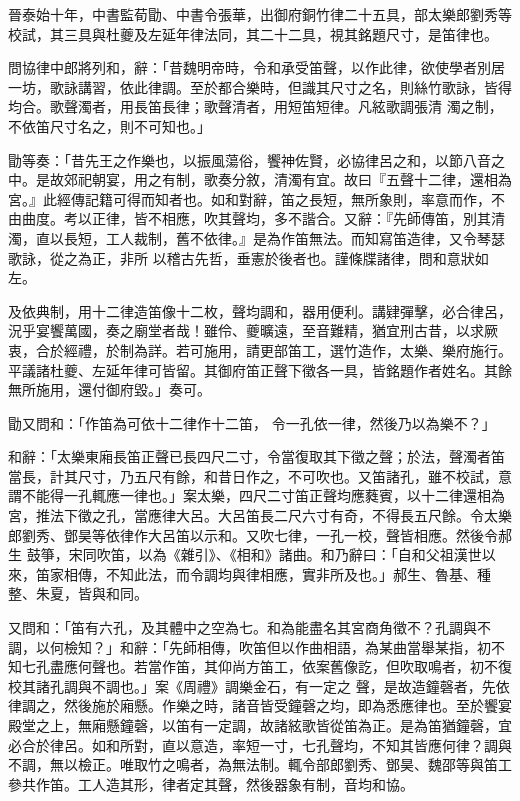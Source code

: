 \begin{pinyinscope}
 晉泰始十年，中書監荀勖、中書令張華，出御府銅竹律二十五具，部太樂郎劉秀等校試，其三具與杜夔及左延年律法同，其二十二具，視其銘題尺寸，是笛律也。



 問協律中郎將列和，辭：「昔魏明帝時，令和承受笛聲，以作此律，欲使學者別居一坊，歌詠講習，依此律調。至於都合樂時，但識其尺寸之名，則絲竹歌詠，皆得均合。歌聲濁者，用長笛長律；歌聲清者，用短笛短律。凡絃歌調張清
 濁之制，不依笛尺寸名之，則不可知也。」



 勖等奏：「昔先王之作樂也，以振風蕩俗，饗神佐賢，必協律呂之和，以節八音之中。是故郊祀朝宴，用之有制，歌奏分敘，清濁有宜。故曰『五聲十二律，還相為宮。』此經傳記籍可得而知者也。如和對辭，笛之長短，無所象則，率意而作，不由曲度。考以正律，皆不相應，吹其聲均，多不諧合。又辭：『先師傳笛，別其清濁，直以長短，工人裁制，舊不依律。』是為作笛無法。而知寫笛造律，又令琴瑟歌詠，從之為正，非所
 以稽古先哲，垂憲於後者也。謹條牒諸律，問和意狀如左。



 及依典制，用十二律造笛像十二枚，聲均調和，器用便利。講肄彈擊，必合律呂，況乎宴饗萬國，奏之廟堂者哉！雖伶、夔曠遠，至音難精，猶宜刑古昔，以求厥衷，合於經禮，於制為詳。若可施用，請更部笛工，選竹造作，太樂、樂府施行。平議諸杜夔、左延年律可皆留。其御府笛正聲下徵各一具，皆銘題作者姓名。其餘無所施用，還付御府毀。」奏可。



 勖又問和：「作笛為可依十二律作十二笛，
 令一孔依一律，然後乃以為樂不？」



 和辭：「太樂東廂長笛正聲已長四尺二寸，令當復取其下徵之聲；於法，聲濁者笛當長，計其尺寸，乃五尺有餘，和昔日作之，不可吹也。又笛諸孔，雖不校試，意謂不能得一孔輒應一律也。」案太樂，四尺二寸笛正聲均應蕤賓，以十二律還相為宮，推法下徵之孔，當應律大呂。大呂笛長二尺六寸有奇，不得長五尺餘。令太樂郎劉秀、鄧昊等依律作大呂笛以示和。又吹七律，一孔一校，聲皆相應。然後令郝生
 鼓箏，宋同吹笛，以為《雜引》、《相和》諸曲。和乃辭曰：「自和父祖漢世以來，笛家相傳，不知此法，而令調均與律相應，實非所及也。」郝生、魯基、種整、朱夏，皆與和同。



 又問和：「笛有六孔，及其體中之空為七。和為能盡名其宮商角徵不？孔調與不調，以何檢知？」和辭：「先師相傳，吹笛但以作曲相語，為某曲當舉某指，初不知七孔盡應何聲也。若當作笛，其仰尚方笛工，依案舊像訖，但吹取鳴者，初不復校其諸孔調與不調也。」案《周禮》調樂金石，有一定之
 聲，是故造鐘磬者，先依律調之，然後施於廂懸。作樂之時，諸音皆受鐘磬之均，即為悉應律也。至於饗宴殿堂之上，無廂懸鐘磬，以笛有一定調，故諸絃歌皆從笛為正。是為笛猶鐘磬，宜必合於律呂。如和所對，直以意造，率短一寸，七孔聲均，不知其皆應何律？調與不調，無以檢正。唯取竹之鳴者，為無法制。輒令部郎劉秀、鄧昊、魏邵等與笛工參共作笛。工人造其形，律者定其聲，然後器象有制，音均和協。




\end{pinyinscope}
